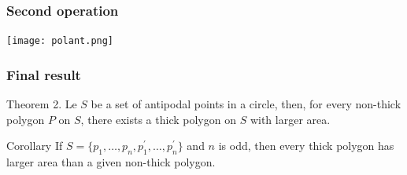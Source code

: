 \documentclass{beamer}
\begin{document}
\begin{frame}
\frametitle{Second operation}
\texttt{[image: polant.png]}

\end{frame}

\begin{frame}
\frametitle{Final result}
\begin{alertblock}{Theorem 2.}
Le $S$ be a set of antipodal points in a circle, then, for every non-thick polygon $P$ on $S$, there exists a thick polygon on $S$ with larger area.
\end{alertblock}\pause
\begin{alertblock}{Corollary}
If $S = \{p_{1},\dots,p_{n},p_{1}^{\prime},\dots,p_{n}^{\prime}\}$ and $n$ is odd, then every thick polygon has larger area than a given non-thick polygon.
\end{alertblock}

\end{frame}
\end{document}
